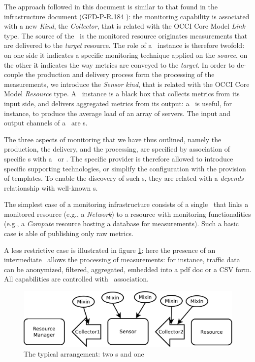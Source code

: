 \documentclass[12pt]{article}  %
\begin{document}
The approach followed in this document is similar to that found in the infrastructure document (GFD-P-R.184 \cite{occi:infr}): the monitoring capability is associated with a new {\em Kind}, the {\em Collector}, that is related with the OCCI Core Model {\em Link} type. The source of the \coll\ is the monitored resource originates measurements that are delivered to the {\em target} resource. The role of a \coll\ instance is therefore twofold: on one side it indicates a specific monitoring technique applied on the {\em source}, on the other it indicates the way metrics are conveyed to the {\em target}. In order to de-couple the production and delivery process form the processing of the measurements, we introduce the {\em Sensor} {\em kind}, that is related with the OCCI Core Model {\em Resource} type. A \sens\ instance is a black box that collects metrics from its input side, and delivers aggregated metrics from its output: a \sens\ is useful, for instance, to produce the average load of an array of servers. The input and output channels of a \sens\ are \coll s.

The three aspects of monitoring that we have thus outlined, namely the production, the delivery, and the processing, are specified by association of specific \mi s with a \sens\ or \coll. The specific provider is therefore allowed to introduce specific supporting technologies, or simplify the configuration with the provision of templates. To enable the discovery of such \mi s, they are related with a {\em depends} relationship with well-known \mi s.

The simplest case of a monitoring infrastructure consists of a single \coll\ that links a monitored resource (e.g., a {\em Network}) to a resource with monitoring functionalities (e.g., a {\em Compute} resource hosting a database for measurements). Such a basic case is able of publishing only raw metrics. 

A less restrictive case is illustrated in figure \ref{fig:twostages}: here the presence of an intermediate \sens\ allows the processing of measurements: for instance, traffic data can be anonymized, filtered, aggregated, embedded into a pdf doc or a CSV form. All capabilities are controlled with \mi\ association.

\begin{figure}
\centering
\includegraphics[width=0.7 \linewidth]{twostages.pdf}
\caption{The typical arrangement: two \coll s and one \sens \label{fig:twostages}}
\end{figure}
\end{document}
